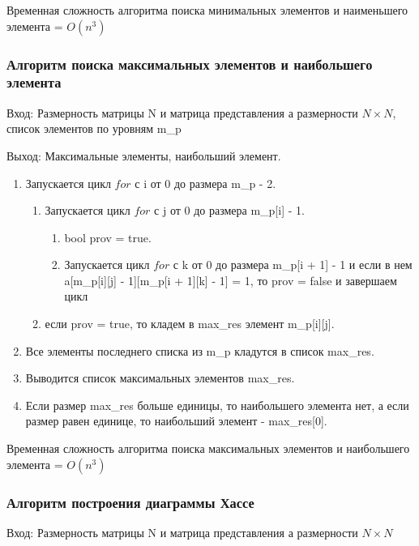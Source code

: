 \documentclass[bachelor, och, labwork]{shiza}
\begin{document}
	Временная сложность алгоритма поиска минимальных элементов и наименьшего элемента = $O(n^3)$	
	
		\subsubsection{Алгоритм поиска максимальных элементов и наибольшего элемента}

		$\textit{Вход:}$ Размерность матрицы N и матрица представления а размерности $N \times N$, список элементов по уровням m\_p
		
		$\textit{Выход:}$  Максимальные элементы, наибольший элемент.
		
		\begin{enumerate} 
			\item Запускается цикл $for$ с i от 0 до размера m\_p - 2.
			\begin{enumerate} 
				\item Запускается цикл $for$ с j от 0 до размера m\_p[i] - 1.
					\begin{enumerate} 
					\item bool prov = true.
					\item Запускается цикл $for$ с k от 0 до размера m\_p[i + 1] - 1 и если в нем a[m\_p[i][j] - 1][m\_p[i + 1][k] - 1] = 1, то prov = false и завершаем цикл
					\end{enumerate}
				\item если prov = true, то кладем в max\_res элемент m\_p[i][j].
			\end{enumerate} 
			\item Все элементы последнего списка из m\_p кладутся в список max\_res.
			\item Выводится список максимальных элементов max\_res.
			\item Если размер max\_res больше единицы, то наибольшего элемента нет, а если размер равен единице, то наибольший элемент - max\_res[0].
		\end{enumerate} 

		Временная сложность алгоритма поиска максимальных элементов и наибольшего элемента = $O(n^3)$		
	
		\subsubsection{Алгоритм построения диаграммы Хассе}	
	
	$\textit{Вход:}$ Размерность матрицы N и матрица представления а размерности $N \times N$
	
\end{document}
